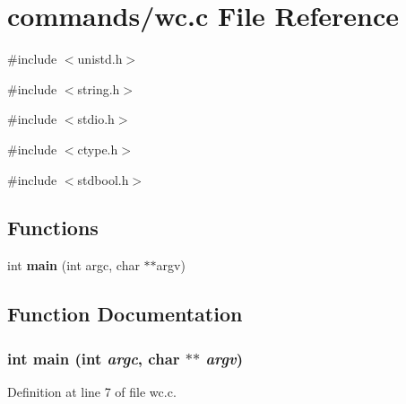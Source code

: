 \section{commands/wc.c File Reference}
\label{wc_8c}
{\ttfamily \#include $<$unistd.h$>$}\par
{\ttfamily \#include $<$string.h$>$}\par
{\ttfamily \#include $<$stdio.h$>$}\par
{\ttfamily \#include $<$ctype.h$>$}\par
{\ttfamily \#include $<$stdbool.h$>$}\par
\subsection*{Functions}
\begin{DoxyCompactItemize}
\item 
int {\bf main} (int argc, char $\ast$$\ast$argv)
\end{DoxyCompactItemize}


\subsection{Function Documentation}
\subsubsection[{main}]{\setlength{\rightskip}{0pt plus 5cm}int main (int {\em argc}, \/  char $\ast$$\ast$ {\em argv})}\label{wc_8c_a3c04138a5bfe5d72780bb7e82a18e627}


Definition at line 7 of file wc.c.

